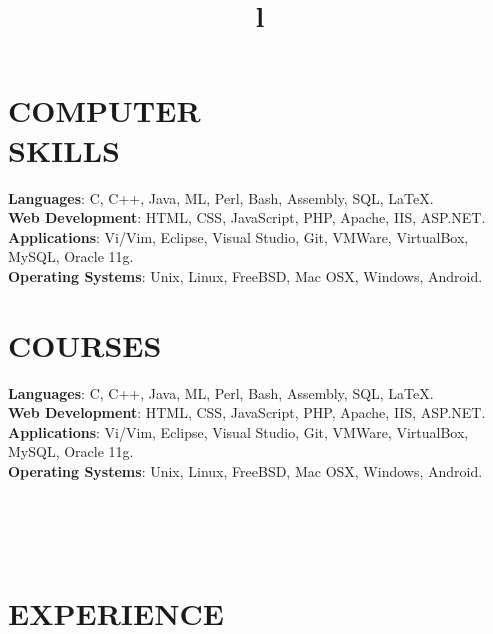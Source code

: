 \documentclass[12pt,margin]{res}
\begin{document}
\begin{resume}
\section{COMPUTER\\SKILLS}

\textbf{Languages}: C, C++, Java, ML, Perl, Bash, Assembly, SQL, \LaTeX.
\\
\textbf{Web Development}: HTML, CSS, JavaScript, PHP, Apache, IIS, ASP.NET.
\\
\textbf{Applications}: Vi/Vim, Eclipse, Visual Studio, Git, VMWare, VirtualBox, 
MySQL, Oracle 11g.
\\
\textbf{Operating Systems}: 
Unix, Linux, FreeBSD, Mac OSX, Windows, Android.
\section{COURSES}

\textbf{Languages}: C, C++, Java, ML, Perl, Bash, Assembly, SQL, \LaTeX.
\\
\textbf{Web Development}: HTML, CSS, JavaScript, PHP, Apache, IIS, ASP.NET.
\\
\textbf{Applications}: Vi/Vim, Eclipse, Visual Studio, Git, VMWare, VirtualBox, 
MySQL, Oracle 11g.
\\
\textbf{Operating Systems}: 
Unix, Linux, FreeBSD, Mac OSX, Windows, Android.

\begin{format}
\title{l}\\
\\
\body\\
\end{format}

\section{EXPERIENCE}


\end{resume}
\end{document}
